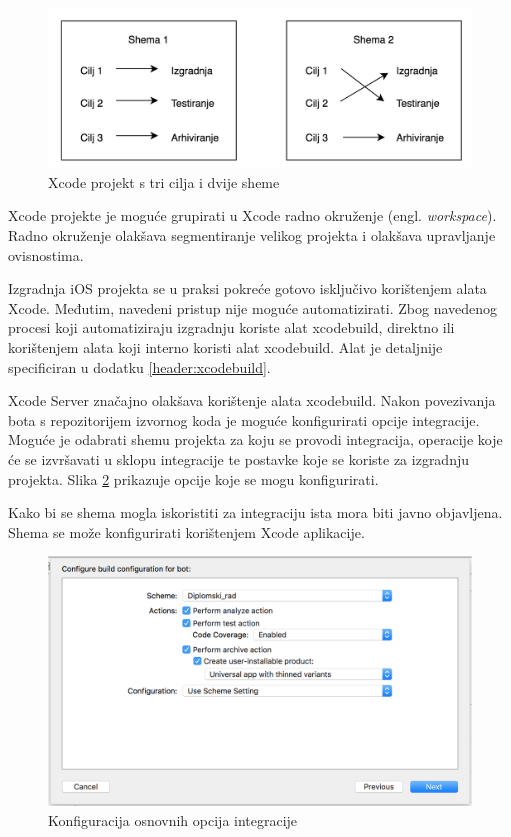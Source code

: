 \documentclass[times, utf8, diplomski, numeric]{fer}
\newcommand{\eng}[1]{(engl. \textit{#1})}
\begin{document}
\begin{figure}[b!]
\centering
\includegraphics[scale=0.5]{TargetScheme}
\caption{Xcode projekt s tri cilja i dvije sheme}
\label{fig:TargetScheme}
\end{figure}

Xcode projekte je moguće grupirati u Xcode radno okruženje \eng{workspace}. Radno okruženje olakšava segmentiranje velikog projekta i olakšava upravljanje ovisnostima.

Izgradnja iOS projekta se u praksi pokreće gotovo isključivo korištenjem alata Xcode. Međutim, navedeni pristup nije moguće automatizirati. Zbog navedenog procesi koji automatiziraju izgradnju koriste alat xcodebuild, direktno ili korištenjem alata koji interno koristi alat xcodebuild. Alat je detaljnije specificiran u dodatku \ref{header:xcodebuild}.

Xcode Server značajno olakšava korištenje alata xcodebuild. Nakon povezivanja bota s repozitorijem izvornog koda je moguće konfigurirati opcije integracije. Moguće je odabrati shemu projekta za koju se provodi integracija, operacije koje će se izvršavati u sklopu integracije te postavke koje se koriste za izgradnju projekta. Slika \ref{fig:XcodeServerOptions} prikazuje opcije koje se mogu konfigurirati.

Kako bi se shema mogla iskoristiti za integraciju ista mora biti javno objavljena. Shema se može konfigurirati korištenjem Xcode aplikacije.

\begin{figure}
\centering
\includegraphics[scale=0.5]{XcodeServerOptions}
\caption{Konfiguracija osnovnih opcija integracije}
\label{fig:XcodeServerOptions}
\end{figure}
\end{document}
